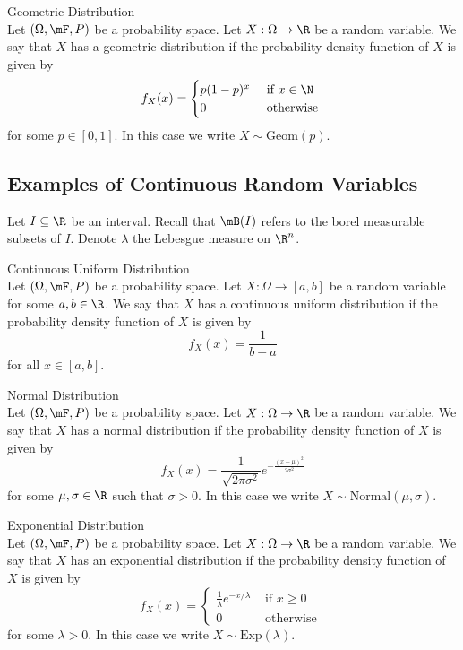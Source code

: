 \documentclass[a4paper]{article}
\begin{document}
\begin{defn}{Geometric Distribution}{}\\
Let $(\Omega,\mF,P)$ be a probability space. Let $X:\Omega\to\R$ be a random variable. We say that $X$ has a geometric distribution if the probability density function of $X$ is given by $$f_X(x)=\begin{cases}
p(1-p)^x & \text{ if }x\in\N\\
0 & \text{ otherwise }
\end{cases}$$ for some $p\in[0,1]$. In this case we write $X\sim\text{Geom}(p)$. 
\end{defn}

\subsection{Examples of Continuous Random Variables}
Let $I\subseteq\R$ be an interval. Recall that $\mB(I)$ refers to the borel measurable subsets of $I$. Denote $\lambda$ the Lebesgue measure on $\R^n$. 

\begin{defn}{Continuous Uniform Distribution}{}\\
Let $(\Omega,\mF,P)$ be a probability space. Let $X:\Omega\to[a,b]$ be a random variable for some $a,b\in\R$. We say that $X$ has a continuous uniform distribution if the probability density function of $X$ is given by $$f_X(x)=\frac{1}{b-a}$$ for all $x\in[a,b]$. 
\end{defn}

\begin{defn}{Normal Distribution}{}\\
Let $(\Omega,\mF,P)$ be a probability space. Let $X:\Omega\to\R$ be a random variable. We say that $X$ has a normal distribution if the probability density function of $X$ is given by $$f_X(x)=\frac{1}{\sqrt{2\pi\sigma^2}}e^{-\frac{(x-\mu)^2}{2\sigma^2}}$$ for some $\mu,\sigma\in\R$ such that $\sigma>0$. In this case we write $X\sim\text{Normal}(\mu,\sigma)$. 
\end{defn}

\begin{defn}{Exponential Distribution}{}\\
Let $(\Omega,\mF,P)$ be a probability space. Let $X:\Omega\to\R$ be a random variable. We say that $X$ has an exponential distribution if the probability density function of $X$ is given by $$f_X(x)=\begin{cases}
\frac{1}{\lambda}e^{-x/\lambda} & \text{ if }x\geq 0\\
0 & \text{ otherwise }
\end{cases}$$ for some $\lambda>0$. In this case we write $X\sim\text{Exp}(\lambda)$. 
\end{defn}
\end{document}
